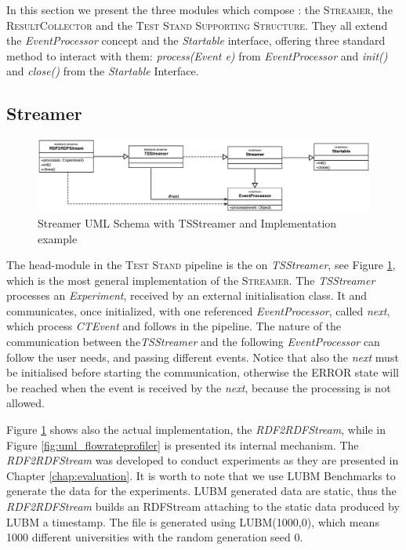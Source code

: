 In this section we present the three modules which compose \name: the \textsc{Streamer},  the \textsc{ResultCollector} and the  \textsc{Test Stand Supporting Structure}. They all extend the \textit{EventProcessor} concept and the \textit{Startable} interface, offering three standard method to interact with them: \textit{process(Event e)} from \textit{EventProcessor} and \textit{init()} and \textit{close()} from the \textit{Startable} Interface.

\subsection{Streamer}	\label{sec:streamer-impl}
\begin{figure}[tbh]
  \centering
	\includegraphics[width=\linewidth]{images/uml_tstreamer}
	\caption{Streamer UML Schema with TSStreamer and Implementation example} 
  	\label{fig:uml_tstreamer}
\end{figure}

The head-module in the \textsc{Test Stand} pipeline is the on \textit{TSStreamer}, see Figure \ref{fig:uml_tstreamer}, which is the most general implementation of the \textsc{Streamer}. The \textit{TSStreamer} processes an \textit{Experiment}, received by an external initialisation class. It and communicates, once initialized, with one referenced \textit{EventProcessor}, called \textit{next}, which process \textit{CTEvent} and follows in the pipeline. The nature of the communication between the\textit{TSStreamer} and the following \textit{EventProcessor} can follow the user needs, and passing different events. Notice that also the \textit{next} must be initialised before starting the communication, otherwise the ERROR state will be reached when the event is received by the \textit{next}, because the processing is not allowed.

Figure \ref{fig:uml_tstreamer} shows also the actual implementation, the \textit{RDF2RDFStream}, while in Figure \ref{fig:uml_flowrateprofiler} is presented its internal mechanism. 
The \textit{RDF2RDFStream} was developed to conduct experiments as they are presented in Chapter \ref{chap:evaluation}.  It is worth to note that we use LUBM Benchmarks to generate the data for the experiments. LUBM generated data are static, thus the \textit{RDF2RDFStream} builds an RDFStream attaching to the static data produced by LUBM a timestamp. The file is generated using  LUBM(1000,0), which means 1000 different universities with the random generation seed 0. 

